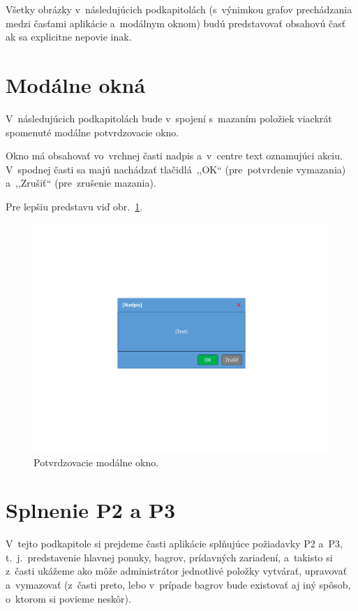 Všetky obrázky v~následujúcich podkapitolách (s~výnimkou grafov prechádzania medzi časťami aplikácie a~modálnym oknom) budú predstavovať obsahovú časť ak sa explicitne nepovie inak.

\section{Modálne okná}

V~následujúcich podkapitolách bude v~spojení s~mazaním položiek viackrát spomenuté modálne potvrdzovacie okno.

Okno má obsahovať vo~vrchnej časti nadpis a~v~centre text oznamujúci akciu. V~spodnej časti sa majú nachádzať tlačidlá~,,OK`` (pre~potvrdenie vymazania) a~,,Zrušiť`` (pre~zrušenie mazania).

Pre lepšiu predstavu viď obr.~\ref{confirmation modal}.

\begin{figure}[H]\centering
\includegraphics[width=140mm]{../img/UI concept/confirmation modal}
\caption{Potvrdzovacie modálne okno.}
\label{confirmation modal}
\end{figure}

\section{Splnenie P2 a P3}

V~tejto podkapitole si prejdeme časti aplikácie splňujúce požiadavky P2 a~P3, t.~j.~predstavenie hlavnej ponuky, bagrov, prídavných zariadení, a~takisto si z~časti ukážeme ako môže administrátor jednotlivé položky vytvárať, upravovať a~vymazovať (z~časti preto, lebo v~prípade bagrov bude existovať aj iný spôsob, o~ktorom si povieme neskôr).

